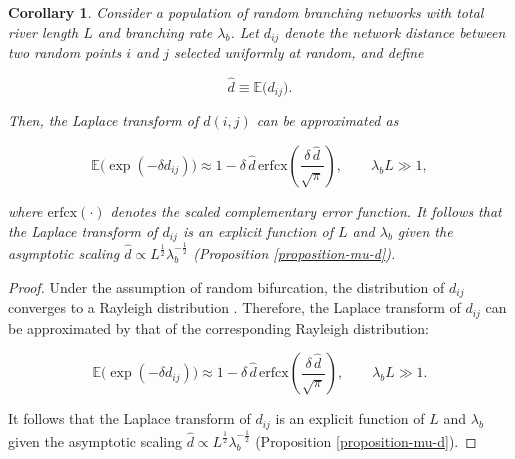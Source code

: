 \documentclass[11pt, class=article, crop=false]{standalone}
\newtheorem{corollary}{Corollary}[subsection]
\theoremstyle{definition}
\begin{document}
\begin{corollary}
\label{collorary-d}
    Consider a population of random branching networks with total river length $L$ and branching rate $\lambda_b$.
    Let $d_{ij}$ denote the network distance between two random points $i$ and $j$ selected uniformly at random, and define
    
    \begin{equation}
    \hat{d} \equiv \mathbb{E}\bigl(d_{ij}\bigr). 
    \end{equation}

    Then, the Laplace transform of $d(i,j)$ can be approximated as

    \begin{equation}
        \mathbb{E}\bigl(\exp (-\delta d_{ij}) \bigr)
        \approx 
        1 - \delta\,\hat{d}\,\mathrm{erfcx}
        \left(
        \frac{\delta\,\hat{d}}{\sqrt{\pi}}
        \right),
        \qquad 
        \lambda_b L \gg 1,
    \end{equation}

    where $\mathrm{erfcx}(\cdot)$ denotes the scaled complementary error function.
    It follows that the Laplace transform of $d_{ij}$ is an explicit function of $L$ and $\lambda_b$ given the asymptotic scaling $\hat{d} \propto L^{\frac{1}{2}} \lambda_b^{-\frac{1}{2}}$ (Proposition \ref{proposition-mu-d}).
\end{corollary}

\begin{proof}
Under the assumption of random bifurcation, the distribution of $d_{ij}$ converges to a Rayleigh distribution \citep{ojeda_distance_2022}.
Therefore, the Laplace transform of $d_{ij}$ can be approximated by that of the corresponding Rayleigh distribution:

\begin{equation}
    \mathbb{E}\bigl(\exp (-\delta d_{ij}) \bigr)
    \approx
    1 - \delta\,\hat{d}\,\mathrm{erfcx}
    \left(
    \frac{\delta\,\hat{d}}{\sqrt{\pi}}
    \right),
    \qquad
    \lambda_b L \gg 1.
\end{equation}

It follows that the Laplace transform of $d_{ij}$ is an explicit function of $L$ and $\lambda_b$ given the asymptotic scaling $\hat{d} \propto L^{\frac{1}{2}} \lambda_b^{-\frac{1}{2}}$ (Proposition \ref{proposition-mu-d}).

\end{proof}
\end{document}
